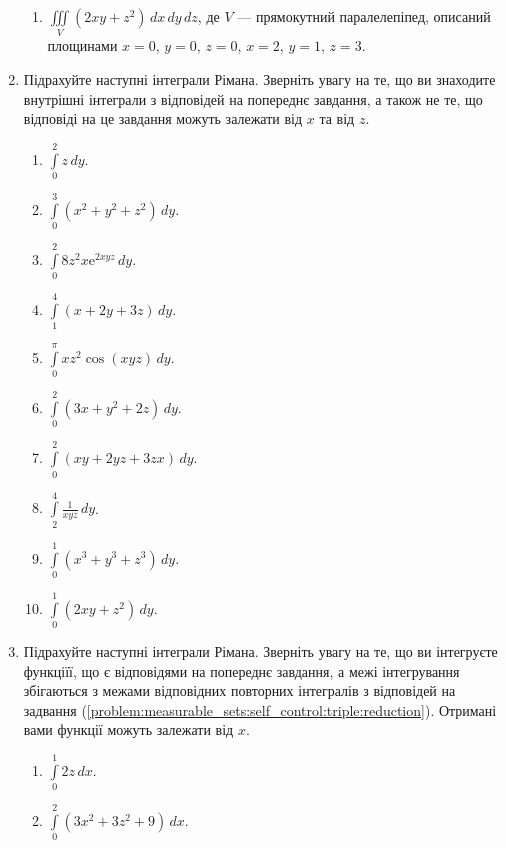 \begin{enumerate}
\begin{enumerate}[label*=\arabic*.]
        \item  $\iiint\limits_{V} \left(2xy + z^2\right) \, dx \, dy \, dz$, де $V$ --- прямокутний паралелепіпед, описаний площинами $x = 0$, $y = 0$, $z = 0$, $x = 2$, $y = 1$, $z = 3$.
    \end{enumerate}
\item \label{problem:measurable_sets:self_control:triple:inner}Підрахуйте наступні інтеграли Рімана. Зверніть увагу на те, що ви знаходите внутрішні інтеграли з відповідей на попереднє завдання, а також не те, що відповіді на це завдання можуть залежати від $x$ та від $z$.
\begin{multicols}{2}
    \begin{enumerate}[label*=\arabic*.]
        \item $\int\limits_0^2 z \,dy$.
        \item $\int\limits_0^3 \left(x^2 + y^2 + z^2\right) \,dy$.
        \item $\int\limits_0^2 8 z^{2} x {\mathrm e}^{{2}{}{x}{}{y}{}{z}} \,dy$.
        \item $\int\limits_1^4 \left(x + 2y + 3z\right) \,dy$.
        \item $\int\limits_0^\pi {x}{}{z^{{2}}}{}{\cos}{\left({x}{}{y}{}{z}\right)} \,dy$.
        \item $\int\limits_0^2 \left(3x + y^2 + 2z\right) \,dy$.
        \item $\int\limits_0^2 \left(xy + 2yz + 3zx\right) \,dy$.
        \item $\int\limits_2^4 \frac{1}{xyz} \,dy$.
        \item $\int\limits_0^1 \left(x^3 + y^3 + z^3\right) \,dy$.
        \item $\int\limits_0^1 \left(2xy + z^2\right) \,dy$.
    \end{enumerate}
\end{multicols}
\item\label{problem:measurable_sets:self_control:triple:middle} Підрахуйте наступні інтеграли Рімана. Зверніть увагу на те, що ви інтегруєте функціїї, що є відповідями на попереднє завдання, а межі інтегрування збігаються з межами відповідних повторних інтегралів з відповідей на задвання (\ref{problem:measurable_sets:self_control:triple:reduction}). Отримані вами функції можуть залежати від $x$.
\begin{multicols}{2}
    \begin{enumerate}[label*=\arabic*.]
        \item $\int\limits_0^1 2z \,dx$.
        \item $\int\limits_0^2 \left(3 x^{2}+3 z^{2}+9\right) \,dx$.

\end{enumerate}
\end{multicols}
\end{enumerate}
